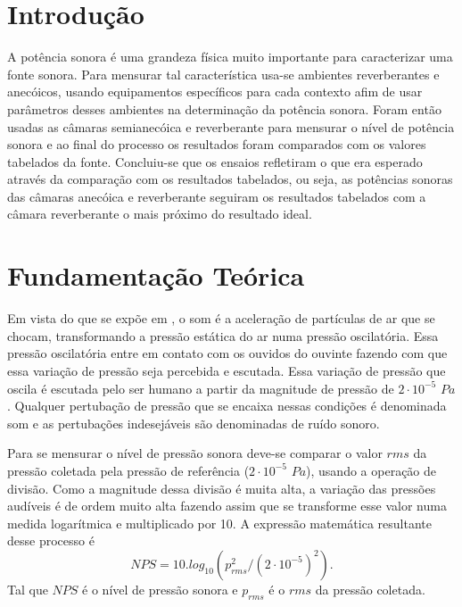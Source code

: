 \chapter{Introdução}\label{introducao}
A potência sonora é uma grandeza física muito importante para caracterizar uma fonte sonora. Para mensurar tal característica usa-se ambientes reverberantes e anecóicos, usando equipamentos específicos para cada contexto afim de usar parâmetros desses ambientes na determinação da potência sonora. Foram então usadas as câmaras semianecóica e reverberante para mensurar o nível de potência sonora e ao final do processo os resultados foram comparados com os valores tabelados da fonte. Concluiu-se que os ensaios refletiram o que era esperado através da comparação com os resultados tabelados, ou seja, as potências sonoras das câmaras anecóica e reverberante seguiram os resultados tabelados com a câmara reverberante o mais próximo do resultado ideal.

\chapter{Fundamentação Teórica}\label{fundamentacao}
Em vista do que se expõe em \cite{bistafa}, o som é a aceleração de partículas de ar que se chocam, transformando a pressão estática do ar numa pressão oscilatória. Essa pressão oscilatória entre em contato com os ouvidos do ouvinte fazendo com que essa variação de pressão seja percebida e escutada. Essa variação de pressão que oscila é escutada pelo ser humano a partir da magnitude de pressão de $2\cdot10^{-5}$ $Pa$. Qualquer pertubação de pressão que se encaixa nessas condições é denominada som e as pertubações indesejáveis são denominadas de ruído sonoro.

Para se mensurar o nível de pressão sonora deve-se comparar	o valor $rms$ da pressão coletada pela pressão de referência ($2\cdot10^{-5}$ $Pa$), usando a operação de divisão. Como a magnitude dessa divisão é muita alta, a variação das pressões audíveis é de ordem muito alta fazendo assim que se transforme esse valor numa medida logarítmica e multiplicado por 10. A expressão matemática resultante desse processo é 
\begin{equation}
  NPS  = 10 . log_10(p_{rms}^{2}/(2\cdot10^{-5})^{2}).
\end{equation}
Tal que $NPS$ é o nível de pressão sonora e $p_{rms}$ é o $rms$ da pressão coletada.

